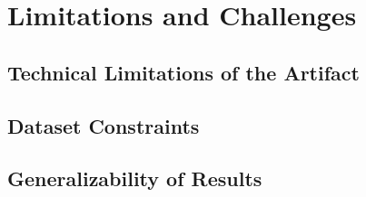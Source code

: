 \section{Limitations and Challenges}
\subsection{Technical Limitations of the Artifact}
\subsection{Dataset Constraints}
\subsection{Generalizability of Results}
